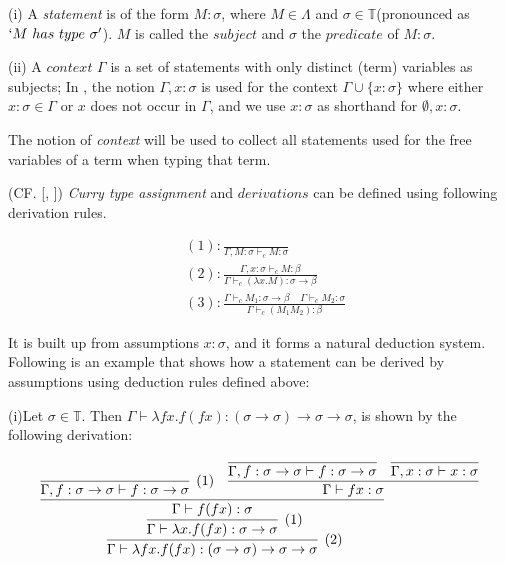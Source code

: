 \begin{def1}
\normalfont (i) A \textit{statement} is of the form $M : \sigma$, where $M\in \Lambda$ and $\sigma \in \mathbb{T}$(pronounced as $`M\ has\ type\ \sigma'$). $M$ is called the $subject$ and $\sigma$ the $predicate$ of $M : \sigma$.  
\end{def1}
(ii) A $context$ $\Gamma$ is a set of statements with only distinct (term) variables as subjects; In \cite{svb2001type}, the notion $\Gamma,x:\sigma$ is used for the context $\Gamma \cup \{x:\sigma\}$ where either $x:\sigma \in \Gamma$ or $x$ does not occur in $\Gamma$, and we use $x:\sigma$ as shorthand for $\emptyset,x:\sigma$.

The notion of \textit{context} will be used to collect all statements used for the free variables of a term when typing that term\cite{svb2001type}. 


\begin{def1}\label{def:derivation}
\normalfont (CF. [\cite{curry1934functionality}, \cite{curry1972combinatory}]) \textit{Curry type assignment} and $derivations$ can be defined using following derivation rules.  
\end{def1}
\begin{align*}
&(1):\frac{}{\Gamma ,M:\sigma \vdash _cM:\sigma} \\
&(2):\frac{\Gamma ,x:\sigma \vdash _cM:\beta}{\Gamma \vdash _c(\lambda x.M):\sigma \rightarrow \beta} \\
&(3):\frac{\Gamma \vdash _cM_1:\sigma \rightarrow \beta\ \ \ \ \ \Gamma \vdash _cM_2:\sigma}{\Gamma \vdash _c(M_1M_2):\beta} 
\end{align*}

It is built up from assumptions $x:\sigma$, and it forms a natural deduction system. Following is an example that shows how a statement can be derived by assumptions using deduction rules defined above:

\begin{exmp}\label{exp}
\normalfont (i)Let $\sigma \in \mathbb{T}$. Then $\Gamma \vdash \lambda fx.f(fx):(\sigma \rightarrow \sigma)\rightarrow \sigma \rightarrow \sigma$, is shown by the following derivation:
\end{exmp}

$$
\infer[(2)]{\Gamma \vdash \lambda fx.f(fx):(\sigma \rightarrow \sigma)\rightarrow \sigma \rightarrow \sigma}{
	\infer[(1)]{\Gamma \vdash \lambda x.f(fx):\sigma \rightarrow \sigma}{
      \infer{\Gamma \vdash f(fx):\sigma}{
             \infer[(1)]{\Gamma,f:\sigma \rightarrow \sigma \vdash f:\sigma \rightarrow \sigma}{}
             & 
             \infer{\Gamma \vdash fx:\sigma}{
                \infer{\Gamma,f:\sigma \rightarrow \sigma \vdash f:\sigma \rightarrow \sigma}{}
                &
                \infer{\Gamma,x:\sigma \vdash x:\sigma}{}
             }
         }
      }		
	}
$$


